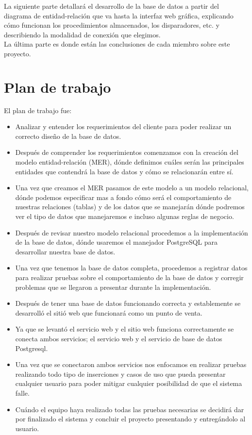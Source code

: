 \documentclass{article}
\begin{document}
La siguiente parte detallará el desarrollo de la base de datos a partir del diagrama de entidad-relación que va hasta la interfaz web gráfica, explicando cómo funcionan los procedimientos almacenados, los disparadores, etc. y describiendo la modalidad de conexión que elegimos.\\

La última parte es donde están las conclusiones de cada miembro sobre este proyecto. \\

\section{Plan de trabajo}
El plan de trabajo fue:\\

\begin{itemize}
\item Analizar y entender los requerimientos del cliente para poder realizar un correcto diseño de la base de datos.  
\item Después de comprender los requerimientos comenzamos con la creación del modelo entidad-relación (MER), dónde definimos cuáles serán las principales entidades que contendrá la base de datos y cómo se relacionarán entre sí. 
\item Una vez que creamos el MER pasamos de este modelo a un modelo relacional, dónde podemos especificar mas a fondo cómo será el comportamiento de nuestras relaciones (tablas) y de los datos que se manejarán dónde podremos ver el tipo de datos que manejaremos e incluso algunas reglas de negocio.  
\item Después de revisar nuestro modelo relacional procedemos a la implementación de la base de datos, dónde usaremos el manejador PostgreSQL para desarrollar nuestra base de datos.  
\item Una vez que tenemos la base de datos completa, procedemos a registrar datos para realizar pruebas sobre el comportamiento de la base de datos y corregir problemas que se llegaron a presentar durante la implementación. 
\item Después de tener una base de datos funcionando correcta y establemente se desarrolló el sitió web que funcionará como un punto de venta.  
\item Ya que se levantó el servicio web y el sitio web funciona correctamente se conecta ambos servicios; el servicio web y el servicio de base de datos Postgresql.  
\item Una vez que se conectaron ambos servicios nos enfocamos en realizar pruebas realizando todo tipo de inserciones y casos de uso que pueda presentar cualquier usuario para poder mitigar cualquier posibilidad de que el sistema falle.  
\item Cuándo el equipo haya realizado todas las pruebas necesarias se decidirá dar por finalizado el sistema y concluir el proyecto presentando y entregándolo al usuario.  
\end{itemize}
\end{document}
